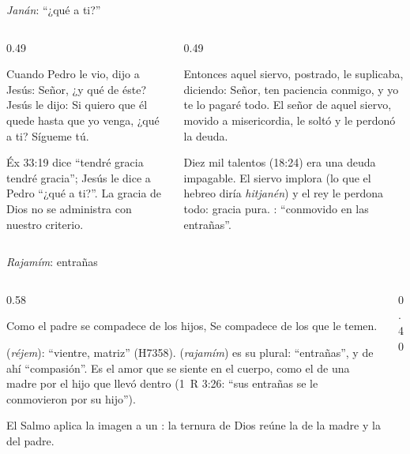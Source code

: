 \begin{frame}{\emph{Janán}: ``¿qué a ti?''}
\begin{columns}[t,onlytextwidth]
\begin{column}{0.49\textwidth}
\begin{cita}Cuando Pedro le vio, dijo a Jesús: Señor, ¿y qué de éste? Jesús le dijo: Si quiero que él quede hasta que yo venga, ¿qué a ti? Sígueme tú.\end{cita}
\small Éx 33:19 dice ``tendré gracia  tendré gracia''; Jesús le dice a Pedro ``¿qué a ti?''. La gracia de Dios no se administra con nuestro criterio.\par\smallskip
{}
\end{column}
\begin{column}{0.49\textwidth}
\begin{cita}Entonces aquel siervo, postrado, le suplicaba, diciendo: Señor, ten paciencia conmigo, y yo te lo pagaré todo. El señor de aquel siervo, movido a misericordia, le soltó y le perdonó la deuda.\end{cita}
\scriptsize Diez mil talentos (18:24) era una deuda impagable. El siervo implora (lo que el hebreo diría \emph{hitjanén}) y el rey le perdona todo: gracia pura. : ``conmovido en las entrañas''.
\end{column}
\end{columns}
\end{frame}

\begin{frame}{\emph{Rajamím}: entrañas}
\begin{columns}[c,onlytextwidth]
\begin{column}{0.58\textwidth}
\begin{cita}Como el padre se compadece de los hijos, Se compadece \SENOR{} de los que le temen.\end{cita}
\begin{center}\end{center}
\scriptsize
{} (\emph{réjem}): ``vientre, matriz'' (H7358).  (\emph{rajamím}) es su plural: ``entrañas'', y de ahí ``compasión''. Es el amor que se siente en el cuerpo, como el de una madre por el hijo que llevó dentro (1~R 3:26: ``sus entrañas se le conmovieron por su hijo'').\par\smallskip
\small El Salmo aplica la imagen a un : la ternura de Dios reúne la de la madre y la del padre.
\end{column}
\begin{column}{0.40\textwidth}\end{column}
\end{columns}
\end{frame}


